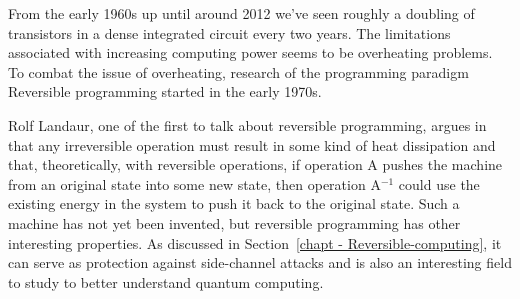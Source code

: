 From the early 1960s up until around 2012 we've seen roughly a doubling of transistors in a dense integrated circuit every two years. The limitations associated with increasing computing power seems to be overheating problems. To combat the issue of overheating, research of the programming paradigm Reversible programming started in the early 1970s.

Rolf Landaur, one of the first to talk about reversible programming, argues in\cite{Irreversibility_paper} that any irreversible operation must result in some kind of heat dissipation and that, theoretically, with reversible operations, if operation A pushes the machine from an original state into some new state, then operation A$^{-1}$ could use the existing energy in the system to push it back to the original state.
Such a machine has not yet been invented, but reversible programming has other interesting properties.
As discussed in Section~\ref{chapt - Reversible-computing}, it can serve as protection against side-channel attacks and is also an interesting field to study to better understand quantum computing.
